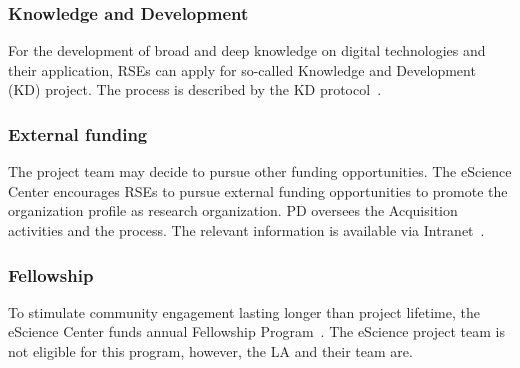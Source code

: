 \subsubsection{Knowledge and Development}
\label{sec:opportunities:kd}
For the development of broad and deep knowledge on digital technologies and their application, RSEs can apply for
so-called Knowledge and Development (KD) project. The process is described by the KD protocol~\cite{intranet}.

\subsubsection{External funding}
\label{sec:opportunities:external-funding}
The project team may decide to pursue other funding opportunities. The eScience Center encourages RSEs to pursue
external funding opportunities to promote the organization profile as research organization. PD oversees the
Acquisition activities and the process. The relevant information is available via Intranet~\cite{intranet}.


\subsubsection{Fellowship}
\label{sec:opportunities:fellowship}
To stimulate community engagement lasting longer than project lifetime, the eScience Center funds annual Fellowship
Program~\cite{fellowship,fellowship-call}. The eScience project team is not eligible for this program, however, the LA and their team are.